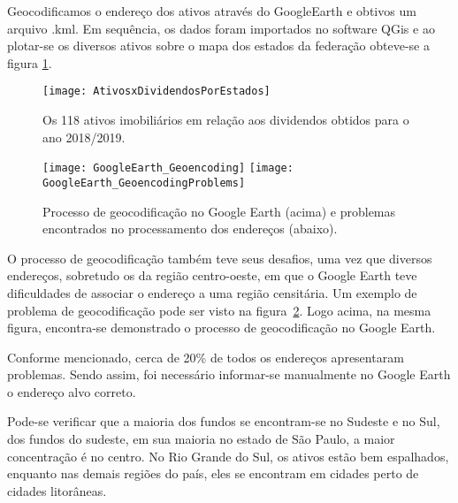 Geocodificamos o endereço dos ativos através do GoogleEarth e obtivos um arquivo .kml. Em sequência, os dados foram importados no software QGis e ao plotar-se os diversos ativos sobre o mapa dos estados da federação obteve-se a figura \ref{fig:papers_vs_dividends}.

\begin{center}
\begin{figure}
\begin{centering}
\texttt{[image: AtivosxDividendosPorEstados]}
\end{centering}
\caption{\label{fig:papers_vs_dividends}Os 118 ativos imobiliários em relação aos dividendos obtidos para o ano 2018/2019.}
\end{figure}
\vspace*{-44pt}
\end{center}

\begin{center}
\begin{figure}
\begin{centering}
\texttt{[image: GoogleEarth\_Geoencoding]}
\texttt{[image: GoogleEarth\_GeoencodingProblems]}
\end{centering}
\caption{\label{fig:geoencoding_and_problems}Processo de geocodificação no Google Earth (acima) e problemas encontrados no processamento dos endereços (abaixo).}
\end{figure}
\vspace*{-44pt}
\end{center}

O processo de geocodificação também teve seus desafios, uma vez que diversos endereços, sobretudo os da região centro-oeste, em que o Google Earth teve dificuldades de associar o endereço a uma região censitária. Um exemplo de problema de geocodificação pode ser visto na figura~\ref{fig:geoencoding_and_problems}. Logo acima, na mesma figura, encontra-se demonstrado o processo de geocodificação no Google Earth. 

Conforme mencionado, cerca de 20\% de todos os endereços apresentaram problemas. Sendo assim, foi necessário informar-se manualmente no Google Earth o endereço alvo correto.

Pode-se verificar que a maioria dos fundos se encontram-se no Sudeste e no Sul, dos fundos do sudeste, em sua maioria no estado de São Paulo, a maior concentração é no centro. No Rio Grande do Sul, os ativos estão bem espalhados, enquanto nas demais regiões do país, eles se encontram em cidades perto de cidades litorâneas. 


